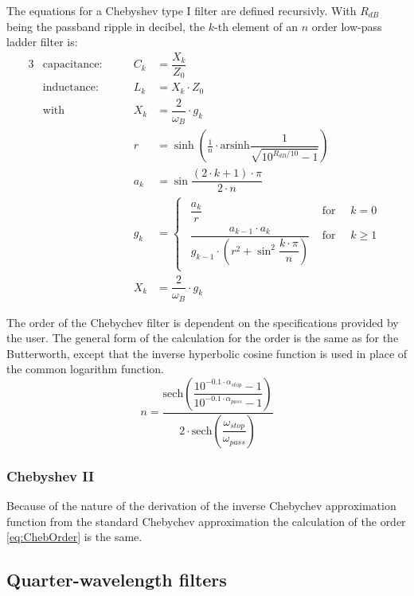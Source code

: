 The equations for a Chebyshev type I filter are defined recursivly.
With $R_{dB}$ being the passband ripple in decibel, the $k$-th
element of an $n$ order low-pass ladder filter is:
\begin{alignat}{3}
 & \text{capacitance:} \qquad & C_k & = \dfrac{X_k}{Z_0} \\
 & \text{inductance:}  \qquad & L_k & = X_k \cdot Z_0 \\
 & \text{with}         \qquad & X_k & = \dfrac{2}{\omega_B}\cdot g_k \\
 & & r   & = \sinh\left( \frac{1}{n}\cdot\text{arsinh}\dfrac{1}{\sqrt{10^{R_{dB}/10} - 1}} \right) \\
 & & a_k & = \sin \dfrac{(2\cdot k + 1)\cdot\pi}{2\cdot n} \\
 & & g_k & =
\begin{cases}
\begin{array}{ll}
  \dfrac{a_k}{r} & \textrm{ for } \quad k=0\\
  \dfrac{a_{k-1}\cdot a_k}{g_{k-1}\cdot \left( r^2 + \sin^2\dfrac{k\cdot\pi}{n} \right)} & \textrm{ for } \quad k\ge 1
\end{array}
\end{cases} \\
 & & X_k & = \dfrac{2}{\omega_B}\cdot g_k
\end{alignat}

The order of the Chebychev filter is dependent on the specifications
provided by the user.  The general form of the calculation for the
order is the same as for the Butterworth, except that the inverse
hyperbolic cosine function is used in place of the common logarithm
function.
\begin{equation}
\label{eq:ChebOrder}
n = \dfrac{\textrm{sech}\left(\dfrac{10^{-0.1\cdot \alpha_{stop}} - 1}{10^{-0.1\cdot \alpha_{pass}} - 1}\right)}{2\cdot\textrm{sech}\left(\dfrac{\omega_{stop}}{\omega_{pass}}\right)}
\end{equation}

\subsubsection{Chebyshev II}

Because of the nature of the derivation of the inverse Chebychev approximation function from the standard Chebychev approximation the calculation of the order \eqref{eq:ChebOrder} is the same.

\subsection{Quarter-wavelength filters}

